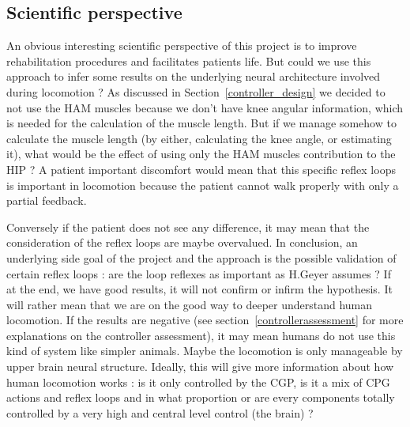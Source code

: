 \documentclass[a4paper,12pt]{article}
\begin{document}
\subsection{Scientific perspective}

An obvious interesting scientific perspective of this project is to improve rehabilitation procedures and facilitates patients life. But could we use this approach to infer some results on the underlying neural architecture involved during locomotion ? As discussed in Section~\ref{controller_design} we decided to not use the HAM muscles because we don't have knee angular information, which is needed for the calculation of the muscle length. But if we manage somehow to calculate the muscle length (by either, calculating the knee angle, or estimating it), what would be the effect of using only the HAM muscles contribution to the HIP ?
\medbreak
A patient important discomfort would mean that this specific reflex loops is important in locomotion  because the patient cannot walk properly with only a partial feedback.

Conversely if the patient does not see any difference, it may mean that the consideration of the reflex loops are maybe overvalued. 
\medbreak
In conclusion, an underlying side goal of the project and the approach is the possible validation of certain reflex loops : are the loop reflexes as important as H.Geyer assumes ? 
If at the end, we have good results, it will not confirm or infirm the hypothesis. It will rather mean that we are on the good way to deeper understand human locomotion.
If the results are negative (see section~\ref{controllerassessment} for more explanations on the controller assessment), it may mean humans do not use this kind of system like simpler animals. Maybe the locomotion is only manageable by upper brain neural structure.
\medbreak
Ideally, this will give more information about how human locomotion works : is it only controlled by the CGP, is it a mix of CPG actions and reflex loops and in what proportion or are every components totally controlled by a very high and central level control (the brain) ?
\end{document}
